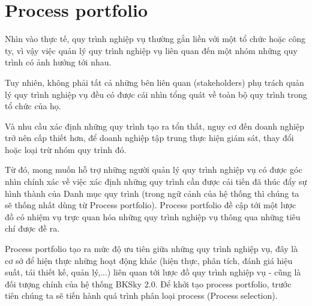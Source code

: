 \section{Process portfolio}

Nhìn vào thực tế, quy trình nghiệp vụ thường gắn liền với một tổ chức hoặc công ty, vì vậy việc quản lý quy trình nghiệp vụ liên quan đến một nhóm những quy trình có ảnh hưởng tới nhau. 

Tuy nhiên, không phải tất cả những bên liên quan (stakeholders) phụ trách quản lý quy trình nghiệp vụ đều có được cái nhìn tổng quát về toàn bộ quy trình trong tổ chức của họ.

Và nhu cầu xác định những quy trình tạo ra tổn thất, nguy cơ đến doanh nghiệp trở nên cấp thiết hơn, để doanh nghiệp tập trung thực hiện giám sát, thay đổi hoặc loại trừ nhóm quy trình đó.

Từ đó, mong muốn hỗ trợ những người quản lý quy trình nghiệp vụ có được góc nhìn chính xác về việc xác định những quy trình cần được cải tiến đã thúc đẩy sự hình thành của Danh mục quy trình (trong ngữ cảnh của hệ thống thì chúng ta sẽ thống nhất dùng từ Process portfolio). Process portfolio đề cập tới một lược đồ có nhiệm vụ trực quan hóa những quy trình nghiệp vụ thông qua những tiêu chí được đề ra.

Process portfolio tạo ra mức độ ưu tiên giữa những quy trình nghiệp vụ, đây là cơ sở để hiện thực những hoạt động khác (hiện thực, phân tích, đánh giá hiệu suất, tái thiết kế, quản lý,...) liên quan tới lược đồ quy trình nghiệp vụ - cũng là đối tượng chính của hệ thống BKSky 2.0. Để khởi tạo process portfolio, trước tiên chúng ta sẽ tiến hành quá trình phân loại process (Process selection).
